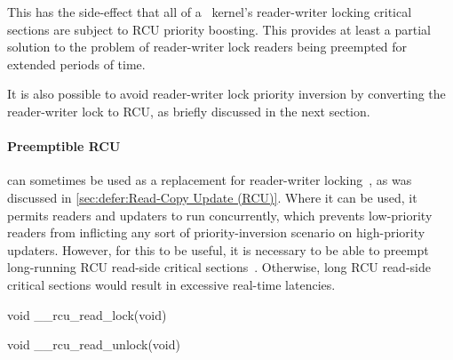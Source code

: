 This has the side-effect that all of a \rt\ kernel's reader-writer locking
critical sections are subject to RCU priority boosting.
This provides at least a partial solution to the problem of reader-writer
lock readers being preempted for extended periods of time.

It is also possible to avoid reader-writer lock priority inversion by
converting the reader-writer lock to RCU, as briefly discussed in the
next section.

\paragraph{Preemptible RCU}
can sometimes be used as a replacement for reader-writer
locking~\cite{PaulEMcKenney2007WhatIsRCUFundamentally,PaulMcKenney2012RCUUsage,PaulEMcKenney2024RCUAPI},
as was discussed in \cref{sec:defer:Read-Copy Update (RCU)}.
Where it can be used, it permits readers and updaters to run concurrently,
which prevents low-priority readers from inflicting any sort of
priority-inversion scenario on high-priority updaters.
However, for this to be useful, it is necessary to be able to preempt
long-running RCU read-side critical
sections~\cite{DinakarGuniguntala2008IBMSysJ}.
Otherwise, long RCU read-side critical sections would result in
excessive real-time latencies.

\begin{listing}
\begin{fcvlabel}
\begin{VerbatimL}[commandchars=\\\[\]]
void __rcu_read_lock(void)									\lnlbl[lock:e]

void __rcu_read_unlock(void)		        						\lnlbl[unl:e]
\end{VerbatimL}
\end{fcvlabel}
\caption{Preemptible Linux-Kernel RCU}
\label{lst:advsync:Preemptible Linux-Kernel RCU}
\end{listing}

